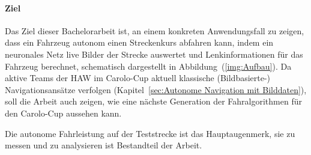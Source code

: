 \paragraph{Ziel}
Das Ziel dieser Bachelorarbeit ist, an einem konkreten Anwendungsfall zu zeigen, dass ein Fahrzeug autonom einen Streckenkurs abfahren kann, indem ein neuronales Netz live Bilder der Strecke auswertet und Lenkinformationen für das Fahrzeug berechnet, schematisch dargestellt in Abbildung~(\ref{img:Aufbau}). Da aktive Teams der HAW im Carolo-Cup aktuell klassische (Bildbasierte-) Navigationsansätze verfolgen (Kapitel~\ref{sec:Autonome Navigation mit Bilddaten}), soll die Arbeit auch zeigen, wie eine nächste Generation der Fahralgorithmen für den Carolo-Cup aussehen kann.

Die autonome Fahrleistung auf der Teststrecke ist das Hauptaugenmerk, sie zu messen und zu analysieren ist Bestandteil der Arbeit.



